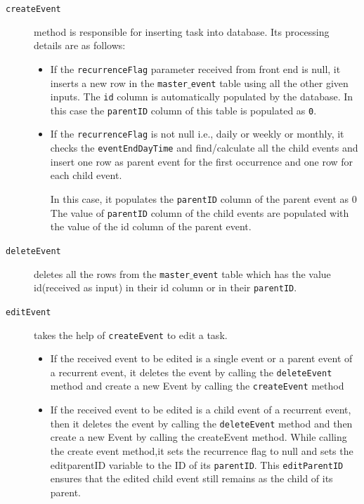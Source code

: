 \documentclass[10pt,a4paper]{report}
\begin{document}
  \begin{description}
  
   
  \item[\texttt{createEvent}] method is responsible for inserting task into database. Its processing details are as follows: 
   
   \begin{itemize}
     \item  If the \texttt{recurrenceFlag} parameter received from front end is null, it inserts a new row in the \texttt{master$\_$event} table using all the other given inputs. The \texttt{id} column is automatically populated by the database. In this case the \texttt{parentID} column of this table is populated as \texttt{0}.

\item If the \texttt{recurrenceFlag} is not null i.e., daily or weekly or monthly, it checks the \texttt{eventEndDayTime} and find/calculate all the child events and insert one row as parent event for the first occurrence and one row for each child event.

In this case, it populates the \texttt{parentID} column of the parent event as 0 The value of \texttt{parentID} column of the child events are populated with the value of the id column of the parent event.
   \end{itemize}
   
 \item[\texttt{deleteEvent}] deletes all the rows from the \texttt{master$\_$event} table which has the value id(received as input) in their id column or in their \texttt{parentID}.   
   
    \item[\texttt{editEvent}] takes the help of \texttt{createEvent} to edit a task. 
  \begin{itemize}
   
   \item If the received event to be edited is a single event or a parent event of a recurrent event, it deletes the event by calling the \texttt{deleteEvent} method and create a new Event by calling the \texttt{createEvent} method

	\item If the received event to be edited is a child event of a recurrent event, then it deletes the event by calling the \texttt{deleteEvent} method and then create a new Event by calling the createEvent method. While calling the create event method,it sets the recurrence flag to null and sets the editparentID variable to the ID of its \texttt{parentID}. This \texttt{editParentID} ensures that the edited child event still remains as the child of its parent.
   
     
\end{itemize}
   
 \end{description}  
	
\end{document}
